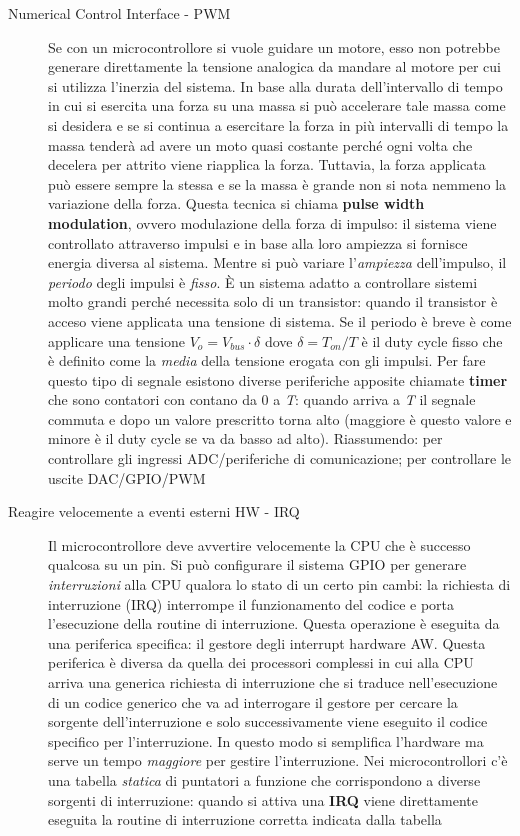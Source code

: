 \documentclass[12pt, a4paper]{report}
\begin{document}
\begin{description}
    \item[Numerical Control Interface - PWM]Se con un microcontrollore si vuole guidare un motore, esso non potrebbe generare direttamente la tensione analogica da mandare al motore per cui si utilizza l'inerzia del sistema. In base alla durata dell'intervallo di tempo in cui si esercita una forza su una massa si può accelerare tale massa come si desidera e se si continua a esercitare la forza in più intervalli di tempo la massa tenderà ad avere un moto quasi costante perché ogni volta che decelera per attrito viene riapplica la forza. Tuttavia, la forza applicata può essere sempre la stessa e se la massa è grande non si nota nemmeno la variazione della forza. Questa tecnica si chiama \textbf{pulse width modulation}, ovvero modulazione della forza di impulso: il sistema viene controllato attraverso impulsi e in base alla loro ampiezza si fornisce energia diversa al sistema. Mentre si può variare l'\textit{ampiezza} dell'impulso, il \textit{periodo} degli impulsi è \textit{fisso}. È un sistema adatto a controllare sistemi molto grandi perché necessita solo di un transistor: quando il transistor è acceso viene applicata una tensione di sistema. Se il periodo è breve è come applicare una tensione $V_{o} = V_{bus} \cdot \delta$ dove $\delta = T_{on} / T$ è il duty cycle fisso che è definito come la \textit{media} della tensione erogata con gli impulsi. Per fare questo tipo di segnale esistono diverse periferiche apposite chiamate \textbf{timer} che sono contatori con contano da 0 a \textit{T}: quando arriva a \textit{T} il segnale commuta e dopo un valore prescritto torna alto (maggiore è questo valore e minore è il duty cycle se va da basso ad alto). Riassumendo: per controllare gli ingressi ADC/periferiche di comunicazione; per controllare le uscite DAC/GPIO/PWM
    \item[Reagire velocemente a eventi esterni HW - IRQ]Il microcontrollore deve avvertire velocemente la CPU  che è successo qualcosa su un pin. Si può configurare il sistema GPIO per generare \textit{interruzioni} alla CPU qualora lo stato di un certo pin cambi: la richiesta di interruzione (IRQ) interrompe il funzionamento del codice e porta l'esecuzione della routine di interruzione. Questa operazione è eseguita da una periferica specifica: il gestore degli interrupt hardware AW. Questa periferica è diversa da quella dei processori complessi in cui alla CPU  arriva una generica richiesta di interruzione che si traduce nell'esecuzione di un codice generico che va ad interrogare il gestore per cercare la sorgente dell'interruzione e solo successivamente viene eseguito il codice specifico per l'interruzione. In questo modo si semplifica l'hardware ma serve un tempo \textit{maggiore} per gestire l'interruzione. Nei microcontrollori c'è una tabella \textit{statica} di puntatori a funzione che corrispondono a diverse sorgenti di interruzione: quando si attiva una \textbf{IRQ} viene direttamente eseguita la routine di interruzione corretta indicata dalla tabella
\end{description}
\end{document}
